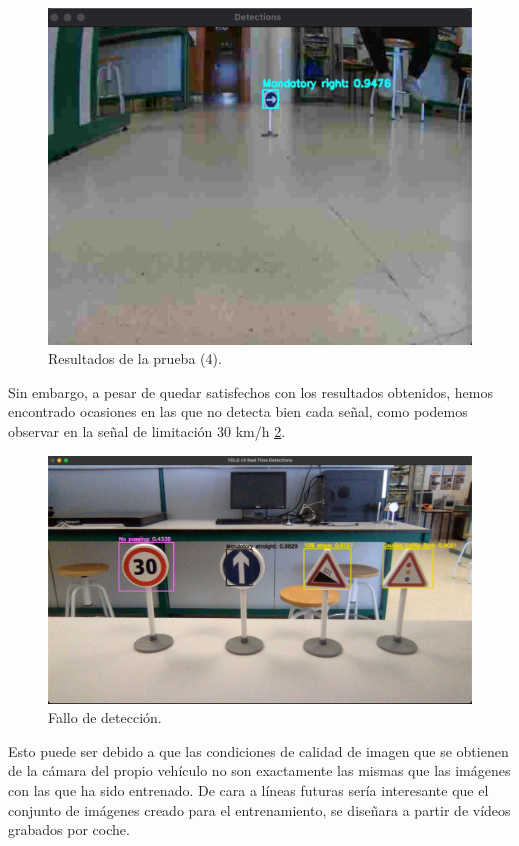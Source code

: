 \begin{figure}[H]
    \centering
 	\includegraphics[width=\textwidth]{Imagenes/IA/YoloCNN_coche3.pdf}
    \caption{Resultados de la prueba (4).}
    \label{c4}
\end{figure}

Sin embargo, a pesar de quedar satisfechos con los resultados obtenidos, hemos encontrado ocasiones en las que no detecta bien cada señal, como podemos observar en la señal de limitación 30 km/h \ref{fallo}. \\

\begin{figure}[H]
    \centering
 	\includegraphics[width=\textwidth]{Imagenes/IA/ejemplo_fallo.pdf}
    \caption{Fallo de detección.}
    \label{fallo}
\end{figure}

Esto puede ser debido a que las condiciones de calidad de imagen que se obtienen de la cámara del propio vehículo no son exactamente las mismas que las imágenes con las que ha sido entrenado. De cara a líneas futuras sería interesante que el conjunto de imágenes creado para el entrenamiento, se diseñara a partir de vídeos grabados por coche.\\

